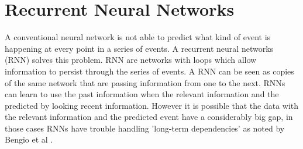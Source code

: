 \section{Recurrent Neural Networks}

A conventional neural network is not able to predict what kind of event is happening at every point in a series of events. A recurrent neural networks (RNN) solves this problem. RNN are networks with loops which allow information to persist through the series of events. A RNN can be seen as copies of the same network that are  passing information from one to the next. RNNs can learn to use the past information when the relevant information and the predicted by looking recent information. However it is possible that the data with the relevant information and the predicted event have a considerably big gap, in those cases RNNs have trouble handling 'long-term dependencies' as noted by Bengio et al \cite{BengioYoshuaSimardPatrice1994LearningDifficult}.